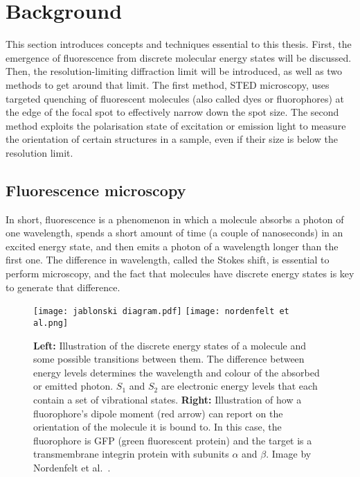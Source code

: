 \chapter{Background}

This section introduces concepts and techniques essential to this thesis. First, the emergence of fluorescence from discrete molecular energy states will be discussed. Then, the resolution-limiting diffraction limit will be introduced, as well as two methods to get around that limit. %
The first method, STED microscopy, uses targeted quenching of fluorescent molecules (also called dyes or fluorophores) at the edge of the focal spot to effectively narrow down the spot size. The second method exploits the polarisation state of excitation or emission light to measure the orientation of certain structures in a sample, even if their size is below the resolution limit.

\section{Fluorescence microscopy}

In short, fluorescence is a phenomenon in which a molecule absorbs a photon of one wavelength, spends a short amount of time (a couple of nanoseconds) in an excited energy state, and then emits a photon of a wavelength longer than the first one. The difference in wavelength, called the Stokes shift, is essential to perform microscopy, and the fact that molecules have discrete energy states is key  to generate that difference.

\begin{figure}
	\centering
	 \texttt{[image: jablonski diagram.pdf]} \hfill \texttt{[image: nordenfelt et al.png]}
	\caption{
		\textbf{Left:} Illustration of the discrete energy states of a molecule and some possible transitions between them. The difference between energy levels determines the wavelength and colour of the absorbed or emitted photon. $ S_1 $ and $ S_2 $ are electronic energy levels that each contain a set of vibrational states. \textbf{Right:} Illustration of how a fluorophore's dipole moment (red arrow) can report on the orientation of the molecule it is bound to. In this case, the fluorophore is GFP (green fluorescent protein) and the target is a transmembrane integrin protein with subunits $ \alpha $ and $ \beta $. Image by Nordenfelt et al.~\cite{Nordenfelt2017}.
	}
	\label{fig:jablonski}
\end{figure}

